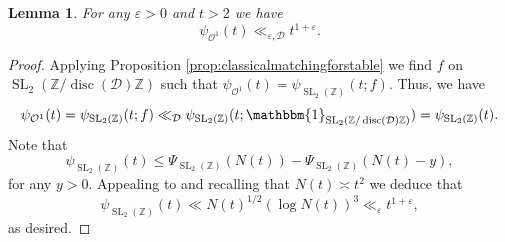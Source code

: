 \documentclass{article}
\newtheorem{lem}{Lemma}[section]
\theoremstyle{named}
\newcommand{\D}{\mathcal{D}}
\newcommand{\Z}{\mathbb{Z}}
\renewcommand{\O}{\mathcal{O}}
\DeclareMathOperator{\SL}{SL}
\DeclareMathOperator{\disc}{disc}
\begin{document}
\begin{lem}\label{lem:basicboundorbitalintegral}
For any $\varepsilon > 0$ and $t > 2$ we have 
\begin{equation*}
    \psi_{\O^1}(t) \ll_{\varepsilon, \D} t^{1 + \varepsilon}.
\end{equation*}
\end{lem}

\begin{proof}
Applying Proposition \ref{prop:classicalmatchingforstable}
we find $f$ on $\SL_2(\Z/\disc(\D)\Z)$ such that $\psi_{\O^1}(t) = \psi_{\SL_2(\Z)}(t; f)$. Thus, we have
\begin{equation*}
    \psi_{\O^1}(t) = \psi_{\SL_2(\Z)}(t; f) \ll_{\D} \psi_{\SL_2(\Z)}(t; \mathbbm{1}_{\SL_2(\Z/\disc(\D)\Z)}) = \psi_{\SL_2(\Z)}(t).
\end{equation*}
Note that 
\begin{equation*}
    \psi_{\SL_2(\Z)}(t) \leq \Psi_{\SL_2(\Z)}(N(t)) - \Psi_{\SL_2(\Z)}(N(t)- y),
\end{equation*}
for any $y > 0$. Appealing to \cite[Lemma 4]{Iwaniec1984} and recalling that $N(t) \asymp t^2$ we deduce that 
\begin{equation*}
    \psi_{\SL_2(\Z)}(t) \ll N(t)^{1/2}(\log N(t))^3 \ll_\varepsilon t^{1 + \varepsilon},
\end{equation*}
as desired.
\end{proof}
\end{document}
